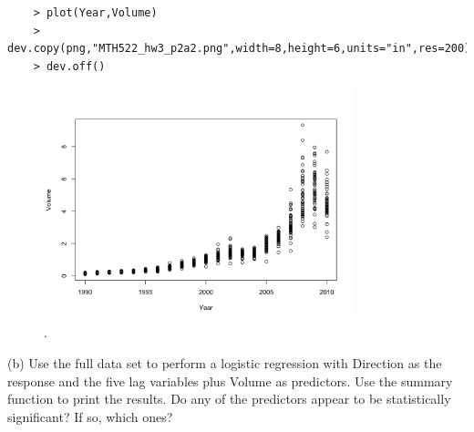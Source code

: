 \documentclass{article}
\begin{document}
\begin{program}
	\begin{verbatim}	
	> plot(Year,Volume)
	> dev.copy(png,"MTH522_hw3_p2a2.png",width=8,height=6,units="in",res=200)
	> dev.off()
	\end{verbatim}
	\caption{The R code generate Figure.\ \ref{fig:MTH522_hw3_p2a2}.}
\end{program}

\begin{figure}[htb]
	\begin{center}
		\includegraphics[width=0.8\textwidth]{MTH522_hw3_p2a2.png}
	\end{center}
	\caption{.}
	\label{fig:MTH522_hw3_p2a2}
\end{figure}


\newpage

(b) Use the full data set to perform a logistic regression with Direction as the response and the five lag variables plus Volume as predictors. Use the summary function to print the results. Do any of the predictors appear to be statistically significant? If so, which ones?
\end{document}
